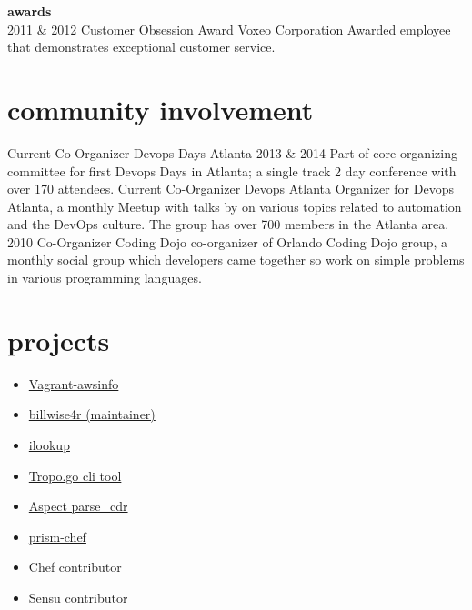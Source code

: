 \documentclass[]{friggeri-cv} %
\begin{document}
    \begin{entrylist}
      \textbf{awards}\\
        \entry
          {2011 \& 2012}
          {Customer Obsession Award}
          {Voxeo Corporation}
          {Awarded employee that demonstrates exceptional customer service.}
    \end{entrylist}


\section{community involvement}

  \begin{entrylist}
    \entry
      {Current}
      {Co-Organizer}
      {Devops Days Atlanta 2013 \& 2014}
      {Part of core organizing committee for first Devops Days in Atlanta; a single track 2 day conference with over 170 attendees.}
    \entry
      {Current}
      {Co-Organizer}
      {Devops Atlanta}
      {Organizer for Devops Atlanta, a monthly Meetup with talks by on various topics related to automation and the DevOps culture. The group has over 700 members in the Atlanta area. }
    \entry
      {2010}
      {Co-Organizer}
      {Coding Dojo}
  {co-organizer of Orlando Coding Dojo group, a monthly social group which developers came together so work on simple problems in various programming languages.}
  \end{entrylist}


\section{projects}
  \begin{multicols}{2}
    \begin{itemize}
      \item
        \href{https://github.com/johntdyer/vagrant-awsinfo}{Vagrant-awsinfo}
      \item
        \href{https://github.com/johntdyer/billwise4r}{billwise4r (maintainer)}
      \item
        \href{https://github.com/johntdyer/ilookup}{ilookup}
      \item
        \href{https://github.com/johntdyer/tropo}{Tropo.go cli tool}
      \item
        \href{https://github.com/johntdyer/parse\_cdr}{Aspect parse\_cdr}
      \item
        \href{https://bitbucket.org/voxeolabs/prism-chef}{prism-chef}
      \item Chef contributor
      \item Sensu contributor
    \end{itemize}
  \end{multicols}
\end{document}
